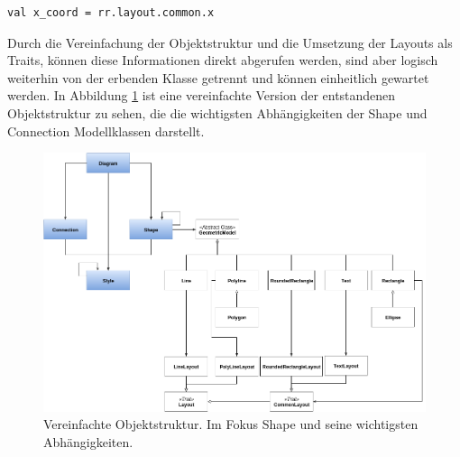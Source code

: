 \begin{lstlisting}[style=scala, caption = {Beispielnavigation durch komplexe Objektsruktur}, label = {lst:navigationsucks}]
val x_coord = rr.layout.common.x
\end{lstlisting}Durch die Vereinfachung der Objektstruktur und die Umsetzung der Layouts als Traits, können diese Informationen direkt abgerufen werden, sind aber logisch weiterhin von der erbenden Klasse getrennt und können einheitlich gewartet werden. In Abbildung \ref{objectstructureShape} ist eine vereinfachte Version der entstandenen Objektstruktur zu sehen, die die wichtigsten Abhängigkeiten der Shape und Connection Modellklassen darstellt.
\begin{figure}[H]
\begin{center}
\includegraphics[width=\textwidth]{Bilder/shapeObjektstruktur.png}
\caption{Vereinfachte Objektstruktur. Im Fokus Shape und seine wichtigsten Abhängigkeiten.}
\label{objectstructureShape}
\end{center}
\end{figure}
